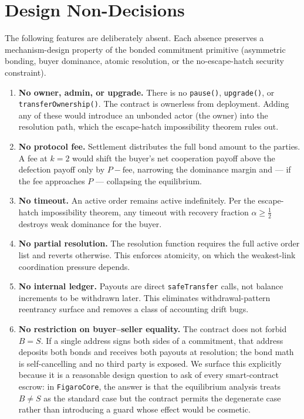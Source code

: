 \documentclass[11pt,a4paper]{article}
\theoremstyle{definition}
\theoremstyle{remark}
\newcommand{\pay}{P}
\begin{document}
\section{Design Non-Decisions}
\label{sec:non-decisions}

The following features are deliberately absent. Each absence
preserves a mechanism-design property of the bonded commitment
primitive (asymmetric bonding, buyer dominance, atomic resolution,
or the no-escape-hatch security constraint).

\begin{enumerate}
  \item \textbf{No owner, admin, or upgrade.} There is no
    \texttt{pause()}, \texttt{upgrade()}, or \texttt{transferOwnership()}.
    The contract is ownerless from deployment. Adding any of these would
    introduce an unbonded actor (the owner) into the resolution path,
    which the escape-hatch impossibility theorem rules out.
  \item \textbf{No protocol fee.} Settlement distributes the full
    bond amount to the parties. A fee at $k = 2$ would shift the
    buyer's net cooperation payoff above the defection payoff
    only by $\pay - \text{fee}$, narrowing the dominance margin and
    --- if the fee approaches $\pay$ --- collapsing the equilibrium.
  \item \textbf{No timeout.} An active order remains active
    indefinitely. Per the escape-hatch impossibility theorem, any
    timeout with recovery fraction $\alpha \geq \tfrac{1}{2}$ destroys
    weak dominance for the buyer.
  \item \textbf{No partial resolution.} The resolution function
    requires the full active order list and reverts otherwise. This
    enforces atomicity, on which the weakest-link coordination
    pressure depends.
  \item \textbf{No internal ledger.} Payouts are direct
    \texttt{safeTransfer} calls, not balance increments to be
    withdrawn later. This eliminates withdrawal-pattern reentrancy
    surface and removes a class of accounting drift bugs.
  \item \textbf{No restriction on buyer--seller equality.} The
    contract does not forbid $B = S$. If a single address signs both
    sides of a commitment, that address deposits both bonds and
    receives both payouts at resolution; the bond math is
    self-cancelling and no third party is exposed. We surface this
    explicitly because it is a reasonable design question to ask of
    every smart-contract escrow: in \texttt{FigaroCore}, the answer
    is that the equilibrium analysis treats $B \neq S$ as the
    standard case but the contract permits the degenerate case
    rather than introducing a guard whose effect would be cosmetic.
\end{enumerate}
\end{document}
